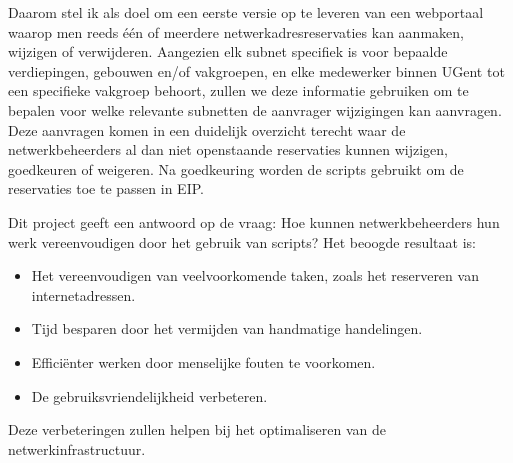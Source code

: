 Daarom stel ik als doel om een eerste versie op te leveren van een webportaal waarop men reeds één of meerdere netwerkadresreservaties kan aanmaken, wijzigen of verwijderen. Aangezien elk subnet specifiek is voor bepaalde verdiepingen, gebouwen en/of vakgroepen, en elke medewerker binnen UGent tot een specifieke vakgroep behoort, zullen we deze informatie gebruiken om te bepalen voor welke relevante subnetten de aanvrager wijzigingen kan aanvragen. Deze aanvragen komen in een duidelijk overzicht terecht waar de netwerkbeheerders al dan niet openstaande reservaties kunnen wijzigen, goedkeuren of weigeren. Na goedkeuring worden de scripts gebruikt om de reservaties toe te passen in EIP.

Dit project geeft een antwoord op de vraag: Hoe kunnen netwerkbeheerders hun werk vereenvoudigen door het gebruik van scripts?
Het beoogde resultaat is:
\begin{itemize}
    \item Het vereenvoudigen van veelvoorkomende taken, zoals het reserveren van internetadressen.
    \item Tijd besparen door het vermijden van handmatige handelingen.
    \item Efficiënter werken door menselijke fouten te voorkomen.
    \item De gebruiksvriendelijkheid verbeteren.
\end{itemize}

Deze verbeteringen zullen helpen bij het optimaliseren van de netwerkinfrastructuur.



